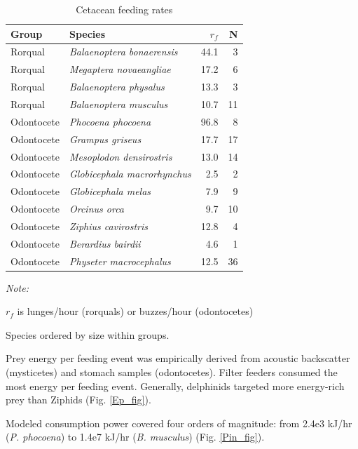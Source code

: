 \documentclass[]{elsarticle} %
\begin{document}
\begin{table}[t]

\caption{\label{tab:unnamed-chunk-1}Cetacean feeding rates \label{rf_tbl}}
\centering
\begin{threeparttable}
\begin{tabular}{llrr}
\toprule
Group & Species & $r_f$ & N\\
\midrule
Rorqual & \textit{Balaenoptera bonaerensis} & 44.1 & 3\\
Rorqual & \textit{Megaptera novaeangliae} & 17.2 & 6\\
Rorqual & \textit{Balaenoptera physalus} & 13.3 & 3\\
Rorqual & \textit{Balaenoptera musculus} & 10.7 & 11\\
Odontocete & \textit{Phocoena phocoena} & 96.8 & 8\\
Odontocete & \textit{Grampus griseus} & 17.7 & 17\\
Odontocete & \textit{Mesoplodon densirostris} & 13.0 & 14\\
Odontocete & \textit{Globicephala macrorhynchus} & 2.5 & 2\\
Odontocete & \textit{Globicephala melas} & 7.9 & 9\\
Odontocete & \textit{Orcinus orca} & 9.7 & 10\\
Odontocete & \textit{Ziphius cavirostris} & 12.8 & 4\\
Odontocete & \textit{Berardius bairdii} & 4.6 & 1\\
Odontocete & \textit{Physeter macrocephalus} & 12.5 & 36\\
\bottomrule
\end{tabular}
\begin{tablenotes}
\item \textit{Note: } 
\item $r_f$ is lunges/hour (rorquals) or buzzes/hour (odontocetes)
\item Species ordered by size within groups.
\end{tablenotes}
\end{threeparttable}
\end{table}

Prey energy per feeding event was empirically derived from acoustic
backscatter (mysticetes) and stomach samples (odontocetes). Filter
feeders consumed the most energy per feeding event. Generally,
delphinids targeted more energy-rich prey than Ziphids (Fig.
\ref{Ep_fig}).

Modeled consumption power covered four orders of magnitude: from 2.4e3
kJ/hr (\emph{P. phocoena}) to 1.4e7 kJ/hr (\emph{B. musculus}) (Fig.
\ref{Pin_fig}).
\end{document}
